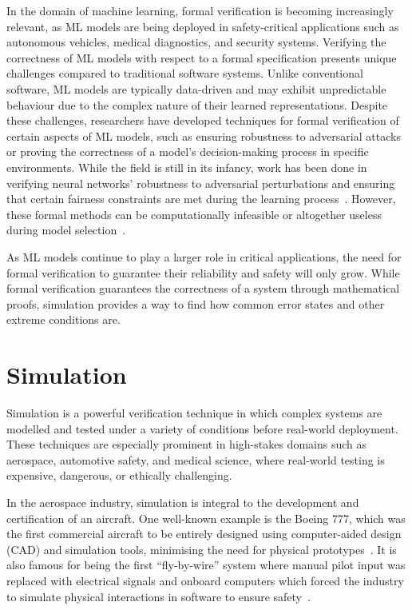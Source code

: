 In the domain of machine learning, formal verification is becoming increasingly relevant, as ML models are being deployed in safety-critical applications such as autonomous vehicles, medical diagnostics, and security systems. 
Verifying the correctness of ML models with respect to a formal specification presents unique challenges compared to traditional software systems. Unlike conventional software, ML models are typically data-driven and may exhibit unpredictable behaviour due to the complex nature of their learned representations. 
Despite these challenges, researchers have developed techniques for formal verification of certain aspects of ML models, such as ensuring robustness to adversarial attacks or proving the correctness of a model’s decision-making process in specific environments. 
While the field is still in its infancy, work has been done in verifying neural networks' robustness to adversarial perturbations and ensuring that certain fairness constraints are met during the learning process~\cite{formal_adversarial}.
However, these formal methods can be computationally infeasible or altogether useless during model selection~\cite{vehicle_testing_review}.

As ML models continue to play a larger role in critical applications, the need for formal verification to guarantee their reliability and safety will only grow.
While formal verification guarantees the correctness of a system through mathematical proofs, simulation provides a way to find how common error states and other extreme conditions are.


\section{Simulation}
Simulation is a powerful verification technique in which complex systems are modelled and tested under a variety of conditions before real-world deployment. These techniques are especially prominent in high-stakes domains such as aerospace, automotive safety, and medical science, where real-world testing is expensive, dangerous, or ethically challenging.

In the aerospace industry, simulation is integral to the development and certification of an aircraft. 
One well-known example is the Boeing 777, which was the first commercial aircraft to be entirely designed using computer-aided design (CAD) and simulation tools, minimising the need for physical prototypes~\cite{boeing777}.
It is also famous for being the first ``fly-by-wire'' system where manual pilot input was replaced with electrical signals and onboard computers which forced the industry to simulate physical interactions in software to ensure safety~\cite{boeing777}.

